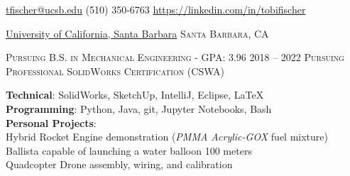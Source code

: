 \documentclass[12pt]{article}
\begin{document}
\sloppy  %



\nobreakvspace{0.3em}  %



\noindent\href{mailto:tfischer@ucsb.edu}{tfischer@ucsb.edu}\sbull
(510) 350-6763 \sbull
\href{https://linkedin.com/in/tobifischer}{https://linkedin.com/in/tobifischer}\hfill
{}


\spacedhrule{0.2em}{-0.6em}  %


\headedsection
{\href{https://engineering.ucsb.edu/}{University of California, Santa Barbara}}
{\textsc{Santa Barbara, CA}} {%
	\headedsubsection
	{\textsc{Pursuing B.S. in Mechanical Engineering - GPA:} 3.96}
	{2018 -- 2022}{}
	\headedsubsection
	{\textsc{Pursuing Professional SolidWorks Certification (CSWA)}}{}{}
	
}

\spacedhrule{0.5em}{-0.5em}


	\textbf{Technical}: SolidWorks, SketchUp, IntelliJ, Eclipse, \LaTeX\\
	\textbf{Programming}: Python, Java, git, Jupyter Notebooks, Bash\\
	\textbf{Personal Projects}:\\
		 \sbull Hybrid Rocket Engine demonstration (\textit{PMMA Acrylic-GOX} fuel mixture)\\
		 \sbull Ballista capable of launching a water balloon 100 meters\\
		 \sbull Quadcopter Drone assembly, wiring, and calibration\\
	
\end{document}
